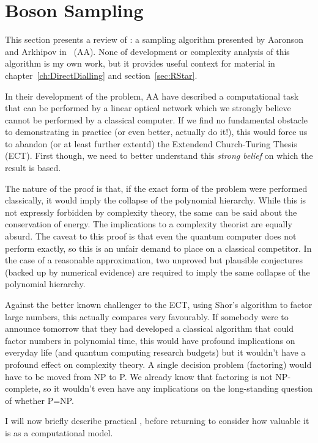 \section{Boson Sampling}
\label{sec:BosenSampling}
This section presents a review of \bosonsampling{}: a sampling algorithm
presented by Aaronson and Arkhipov in~\cite{bosonsampling} (AA). None of
development or complexity analysis of this algorithm is my own work, but it
provides useful context for material in chapter~\ref{ch:DirectDialling} and
section~\ref{sec:RStar}.

In their development of the \bosonsampling{} problem, AA have described a
computational task that can be performed by a linear optical network which we
strongly believe cannot be performed by a classical computer. If we find no
fundamental obstacle to demonstrating \bosonsampling{} in practice (or even
better, actually do it!), this would force us to abandon (or at least further
extentd) the Extendend Church-Turing Thesis (ECT). First though, we need to
better understand this \emph{strong belief} on which the result is based.

The nature of the proof is that, if
the exact form of the \bosonsampling{} problem were performed classically, it
would imply the collapse of the polynomial hierarchy. While this is not
expressly forbidden by complexity theory, the same can be said about the
conservation of energy. The implications to a complexity theorist are equally
absurd. The caveat to this proof is that even the quantum computer does not
perform \bosonsampling{} exactly, so this is an unfair demand to place on a
classical competitor. In the case of a reasonable approximation, two unproved
but plausible conjectures (backed up by numerical evidence) are required to
imply the same collapse of the polynomial hierarchy.

Against the better known challenger to the ECT, using Shor's algorithm to factor
large numbers, this actually compares very favourably. If somebody were to
announce tomorrow that they had developed a classical algorithm that could
factor numbers in polynomial time, this would have profound implications on
everyday life (and quantum computing research budgets) but it wouldn't have a
profound effect on complexity theory. A single decision problem (factoring)
would have to be moved from NP to P. We already know that factoring is not
NP-complete, so it wouldn't even have any implications on the long-standing
question of whether P=NP.

I will now briefly describe practical \bosonsampling{}, before returning to
consider how valuable it is as a computational model. 

